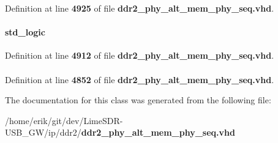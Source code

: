 Definition at line {\bf 4925} of file {\bf ddr2\+\_\+phy\+\_\+alt\+\_\+mem\+\_\+phy\+\_\+seq.\+vhd}.

\paragraph[{waitreq\+\_\+int}]{ {\bfseries \textcolor{comment}{std\+\_\+logic}\textcolor{vhdlchar}{ }} \hspace{0.3cm}{\ttfamily [Signal]}}\label{classddr2__phy__alt__mem__phy__mmi_1_1struct_a1afcca6c7c0c1300fb799dff9456b84b}


Definition at line {\bf 4912} of file {\bf ddr2\+\_\+phy\+\_\+alt\+\_\+mem\+\_\+phy\+\_\+seq.\+vhd}.

\paragraph[{work}]{\hspace{0.3cm}{\ttfamily [Library]}}\label{classddr2__phy__alt__mem__phy__mmi_1_1struct_a9f49de6f5eed5b4488cba6c9cdd1c215}


Definition at line {\bf 4852} of file {\bf ddr2\+\_\+phy\+\_\+alt\+\_\+mem\+\_\+phy\+\_\+seq.\+vhd}.



The documentation for this class was generated from the following file\+:\begin{DoxyCompactItemize}
\item 
/home/erik/git/dev/\+Lime\+S\+D\+R-\/\+U\+S\+B\+\_\+\+G\+W/ip/ddr2/{\bf ddr2\+\_\+phy\+\_\+alt\+\_\+mem\+\_\+phy\+\_\+seq.\+vhd}\end{DoxyCompactItemize}
